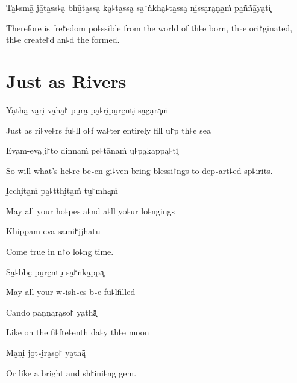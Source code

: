 Ta̱꜕smā̱ jā̱ta̱ss꜕a̮ bhū̱ta̱ssa̮ ka̮꜕ta̱ssa̮ sa̱꜓ṅkha̮꜕ta̱ssa̮ ni̱ssa̮ra̮ṇa̱ṁ pa̱ññā̱ya̮ti͓

\begin{english}
  Therefore is fre꜓edom po꜕ssible from the world of th꜕e born, th꜕e ori꜓ginated, th꜕e create꜓d an꜕d the formed.
\end{english}

\chapter{Just as Rivers}


Ya̮thā̱ vā̱ri̮-va̮hā̱꜓ pū̱rā̱ pa̮꜕ri̮pū̱re̱nti̮ sā̱ga̮ra͓ṁ

\begin{english}
  Just as ri꜕ve꜕rs fu꜕ll o꜕f wa꜕ter entirely fill u꜓p th꜕e sea
\end{english}

E̱va̮m-e̱va̮ i̮꜓to̱ di̱nna̱ṁ pe̱꜕tā̱na̱ṁ u̮꜕pa̮ka̱ppa̮꜕ti͓

\begin{english}
  So will what's he꜕re be꜕en gi꜕ven bring blessi꜓ngs to dep꜕art꜕ed sp꜕irits.
\end{english}

I̱cchi̮ta̱ṁ pa̱꜕tthi̮ta̱ṁ tu̱꜓mha͓ṁ

\begin{english}
  May all your ho꜕pes a꜕nd a꜕ll yo꜕ur lo꜕ngings
\end{english}

Khippam-eva sami꜓jjhatu

\begin{english}
  Come true in n꜓o lo꜕ng time.
\end{english}

Sa̱꜕bbe̱ pū̱re̱ntu̮ sa̱꜓ṅka̱ppā͓

\begin{english}
  May all your w꜕ish꜕es b꜕e fu꜕lfilled
\end{english}

Ca̱ndo̱ pa̱ṇṇa̮ra̮so̱꜓ ya̮thā͓

\begin{english}
  Like on the fi꜕fte꜕enth da꜕y th꜕e moon
\end{english}

Ma̮ṇi̮ jo̱t꜕i̮ra̮so̱꜓ ya̮thā͓

\begin{english}
  Or like a bright and sh꜓ini꜕ng gem.
\end{english}

